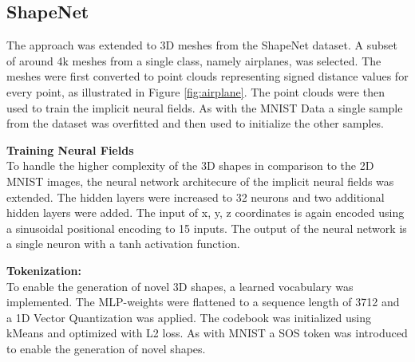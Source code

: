 \subsection*{ShapeNet}

The approach was extended to 3D meshes from the ShapeNet dataset. A subset of around 4k meshes from a single class, namely airplanes, was selected. The meshes were first converted to point clouds representing signed distance values for every point, as illustrated in Figure \ref{fig:airplane}. The point clouds were then used to train the implicit neural fields. As with the MNIST Data a single sample from the dataset was overfitted and then used to initialize the other samples.
\vspace{1em}

\noindent
\textbf{Training Neural Fields}\\
To handle the higher complexity of the 3D shapes in comparison to the 2D MNIST images, the neural network architecure of the implicit neural fields was extended. The hidden layers were increased to 32 neurons and two additional hidden layers were added. The input of x, y, z coordinates is again encoded using a sinusoidal positional encoding to 15 inputs. The output of the neural network is a single neuron with a tanh activation function.




\vspace{1em}

\noindent
\textbf{Tokenization:}\\
To enable the generation of novel 3D shapes, a learned vocabulary was implemented. The MLP-weights were flattened to a sequence length of 3712 and a 1D Vector Quantization was applied. The codebook was initialized using kMeans and optimized with L2 loss. As with MNIST a SOS token was introduced to enable the generation of novel shapes.
\vspace{1em}

